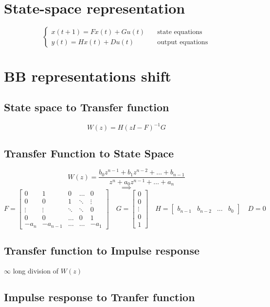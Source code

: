 \documentclass{report}
\begin{document}
\section{State-space representation}
\[
\begin{cases}
x(t+1)=Fx(t)+Gu(t)&\quad\text{state equations}\\
y(t)=Hx(t)+Du(t)&\quad\text{output equations}
\end{cases}
\]
\section{BB representations shift}

\subsection{State space to Transfer function}
\[
W(z)=H(zI-F)^{-1}G
\]

\subsection{Transfer Function to State Space}
\[
W(z)=\frac{b_0z^{n-1}+b_1z^{n-2}+\dots+b_{n-1}}{z^n+a_0z^{n-1}+\dots+a_n}
\]
\[\implies\]
\[
F=
\begin{bmatrix}
0&1&0&\dots&0\\
0&0&1&\ddots&\vdots\\
\vdots&\vdots&\ddots&\ddots&0\\
0&0&\dots&0&1\\
-a_n&-a_{n-1}&\dots&\dots&-a_1
\end{bmatrix}
\quad
G=\begin{bmatrix}
0\\0\\\vdots\\0\\1
\end{bmatrix}
\quad
H=\begin{bmatrix}
b_{n-1}&b_{n-2}&\dots&b_0
\end{bmatrix}
\quad
D=0
\]

\subsection{Transfer function to Impulse response}
$\infty$ long division of $W(z)$

\subsection{Impulse response to Tranfer function}
\end{document}
